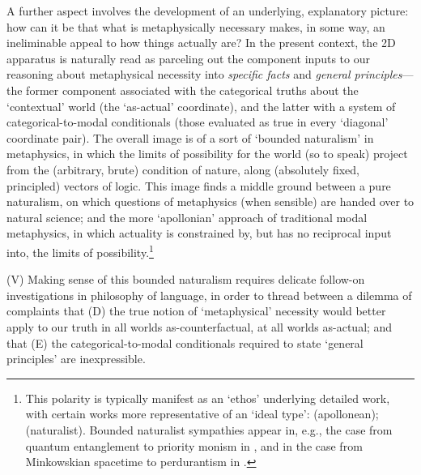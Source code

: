 \documentclass[12pt]{article}
\begin{document}
A further aspect involves the development of an underlying, explanatory
picture: how can it be that what is metaphysically necessary makes, in some
way, an ineliminable appeal to how things actually are? In the present
context, the 2D apparatus is naturally read as parceling out the component
inputs to our reasoning about metaphysical necessity into \emph{specific
facts} and \emph{general principles}---the former component associated with
the categorical truths about the `contextual' world (the `as-actual'
coordinate), and the latter with a system of categorical-to-modal conditionals
(those evaluated as true in every `diagonal' coordinate pair). The overall
image is of a sort of `bounded naturalism' in metaphysics, in which the limits
of possibility for the world (so to speak) project from the (arbitrary, brute)
condition of nature, along (absolutely fixed, principled) vectors of logic.
This image finds a middle ground between a pure naturalism, on which questions
of metaphysics (when sensible) are handed over to natural science; and the
more `apollonian' approach of traditional modal metaphysics, in which
actuality is constrained by, but has no reciprocal input into, the limits of
possibility.\footnote{This polarity is typically manifest as an `ethos'
underlying detailed work, with certain works more representative of an `ideal
type': \citep{Fine2011-FINWIM,Hawthorne2011-HAWHMA,williamson13} (apollonean);
\citep{Ladyman2007-LADETM,Price2007-PRIQN} (naturalist). Bounded naturalist
sympathies appear in, e.g., the case from quantum entanglement to priority
monism in \citep{Schaffer2010-SCHMTP-2}, and in the case from Minkowskian
spacetime to perdurantism in \citep{sider01}.}


\smallskip{}

(V) Making sense of this bounded naturalism requires delicate follow-on
investigations in philosophy of language, in order to thread between a dilemma
of complaints that (D) the true notion of `metaphysical' necessity would
better apply to our truth in all worlds as-counterfactual, at all worlds
as-actual; and that (E) the categorical-to-modal conditionals required to
state `general principles' are inexpressible.
\end{document}
